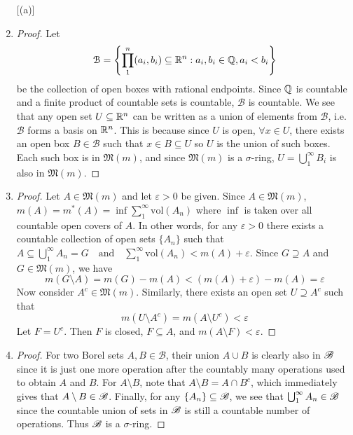 \documentclass[11pt]{article}
\let\eps\varepsilon
\begin{document}
\begin{exercise}{1}
    \begin{enumerate} [(a)]
        \item \begin{proof}
            Let $$\mathcal{B} = \left\{ \prod_1^n (a_i, b_i) \subseteq \mathbb{R}^n : a_i, b_i \in \mathbb{Q}, a_i < b_i \right\}$$ be the collection of open boxes with rational endpoints. Since $\mathbb{Q}$ is countable and a finite product of countable sets is countable, $\mathcal{B}$ is countable. We see that any open set $U \subseteq \mathbb{R}^n$ can be written as a union of elements from $\mathcal{B}$, i.e. $\mathcal{B}$ forms a basis on $\mathbb{R}^n$. This is because since $U$ is open, $\forall x \in U$, there exists an open box $B \in \mathcal{B}$ such that $x \in B \subseteq U$ so $U$ is the union of such boxes. Each such box is in $\mathfrak{M}(m)$, and since $\mathfrak{M}(m)$ is a $\sigma$-ring, $U = \bigcup_1^\infty B_i$ is also in $\mathfrak{M}(m)$.
        \end{proof}
        \item \begin{proof}
            Let $A \in \mathfrak{M}(m)$ and let $\eps > 0$ be given. Since $A \in \mathfrak{M}(m)$, $m(A) = m^*(A) = \inf \sum_1^\infty \mathrm{vol}(A_n)$ where $\inf$ is taken over all countable open covers of $A$. In other words, for any $\eps > 0$ there exists a countable collection of open sets $\{ A_n \}$ such that $A \subseteq \bigcup_1^\infty A_n = G \quad \text{and} \quad \sum_1^\infty \mathrm{vol}(A_n) < m(A) + \eps$. Since $G \supseteq A$ and $G \in \mathfrak{M}(m)$, we have $$m(G \setminus A) = m(G) - m(A) < (m(A) + \eps) - m(A) = \eps$$ Now consider $A^c \in \mathfrak{M}(m)$. Similarly, there exists an open set $U \supseteq A^c$ such that $$m(U \setminus A^c) = m(A \setminus U^c) < \eps$$ Let $F = U^c$. Then $F$ is closed, $F \subseteq A$, and $m(A \setminus F) < \eps$.
        \end{proof}
        \item \begin{proof}
            For two Borel sets $A, B \in \mathscr{B}$, their union $A \cup B$ is clearly also in $\mathscr{B}$ since it is just one more operation after the countably many operations used to obtain $A$ and $B$. For $A \setminus B$, note that $A \setminus B = A \cap B^c$, which immediately gives that $A \setminus B \in \mathscr{B}$. Finally, for any $\{ A_n \} \subseteq \mathscr{B}$, we see that $\bigcup_1^\infty A_n \in \mathscr{B}$ since the countable union of sets in $\mathscr{B}$ is still a countable number of operations. Thus $\mathscr{B}$ is a $\sigma$-ring.

\end{proof}
\end{enumerate}
\end{exercise}
\end{document}
